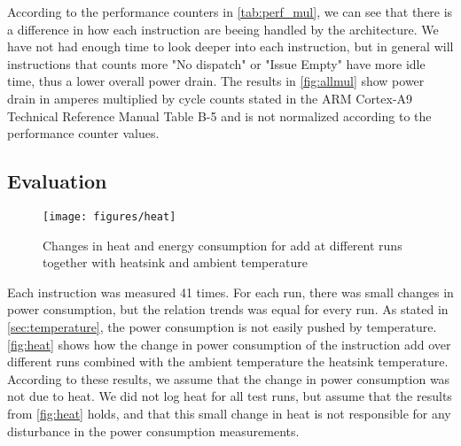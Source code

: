 According to the performance counters in \autoref{tab:perf_mul}, we can see that
there is a difference in how each instruction are beeing handled by the
architecture. We have not had enough time to look deeper into each instruction,
but in general will instructions that counts more "No dispatch" or "Issue Empty"
have more idle time, thus a lower overall power drain. The results in
\autoref{fig:allmul} show power drain in amperes multiplied by cycle counts
stated in the ARM Cortex-A9 Technical Reference Manual Table B-5\cite{armtech}
and is not normalized according to the performance counter values.

\subsection{Evaluation}
\begin{figure}
    \centering
    \texttt{[image: figures/heat]}
    \caption{Changes in heat and energy consumption for {\ttfamily add} at
    different runs together with heatsink and ambient temperature}
    \label{fig:heat}
\end{figure}

Each instruction was measured 41 times. For each run, there was small changes in
power consumption, but the relation trends was equal for every run.  As stated
in \autoref{sec:temperature}, the power consumption is not easily pushed by
temperature. \autoref{fig:heat} shows how the change in power consumption of the
instruction {\ttfamily add} over different runs combined with the ambient
temperature the heatsink temperature. According to these results, we assume that
the change in power consumption was not due to heat. We did not log heat for all
test runs, but assume that the results from \autoref{fig:heat} holds, and that
this small change in heat is not responsible for any disturbance in the power
consumption measurements.

